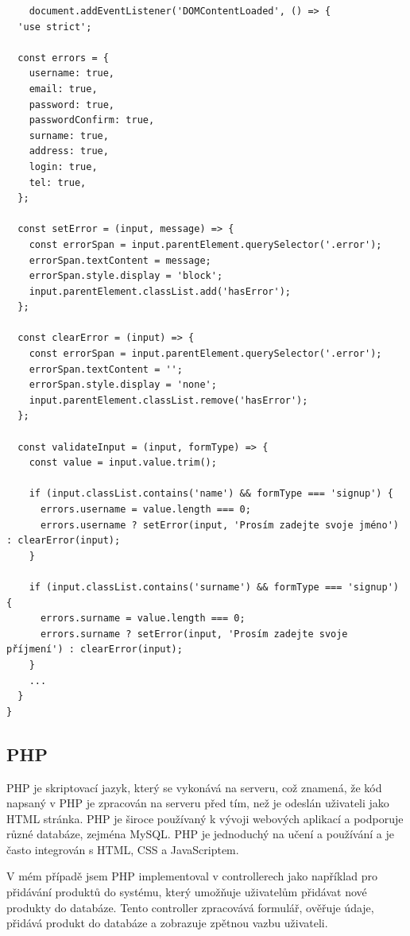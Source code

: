 \documentclass[12pt, a4paper]{report}
\begin{document}
\begin{verbatim}
    document.addEventListener('DOMContentLoaded', () => {
  'use strict';

  const errors = {
    username: true,
    email: true,
    password: true,
    passwordConfirm: true,
    surname: true,
    address: true,
    login: true,
    tel: true,
  };

  const setError = (input, message) => {
    const errorSpan = input.parentElement.querySelector('.error');
    errorSpan.textContent = message;
    errorSpan.style.display = 'block';
    input.parentElement.classList.add('hasError');
  };

  const clearError = (input) => {
    const errorSpan = input.parentElement.querySelector('.error');
    errorSpan.textContent = '';
    errorSpan.style.display = 'none';
    input.parentElement.classList.remove('hasError');
  };

  const validateInput = (input, formType) => {
    const value = input.value.trim();

    if (input.classList.contains('name') && formType === 'signup') {
      errors.username = value.length === 0;
      errors.username ? setError(input, 'Prosím zadejte svoje jméno') : clearError(input);
    }

    if (input.classList.contains('surname') && formType === 'signup') {
      errors.surname = value.length === 0;
      errors.surname ? setError(input, 'Prosím zadejte svoje příjmení') : clearError(input);
    }
    ...
  }
}
    \end{verbatim}

\subsection{PHP}
PHP je skriptovací jazyk, který se vykonává na serveru, což znamená, že kód napsaný v PHP je zpracován na serveru před tím, než je odeslán uživateli jako HTML stránka. PHP je široce používaný k vývoji webových aplikací a podporuje různé databáze, zejména MySQL. PHP je jednoduchý na učení a používání a je často integrován s HTML, CSS a JavaScriptem.

V mém případě jsem PHP implementoval v controllerech jako například pro přidávání produktů do systému, který umožňuje uživatelům přidávat nové produkty do databáze. Tento controller zpracovává formulář, ověřuje údaje, přidává produkt do databáze a zobrazuje zpětnou vazbu uživateli.
\end{document}
